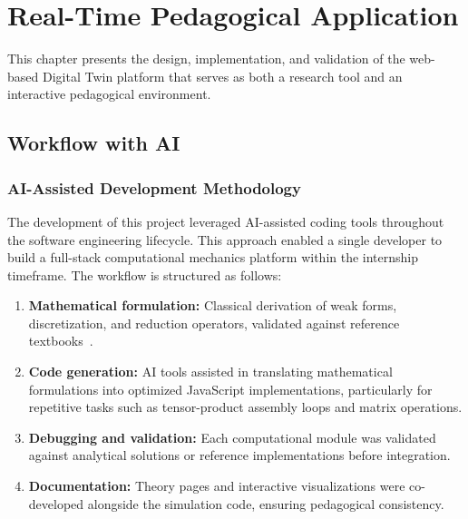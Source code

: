 \chapter{Real-Time Pedagogical Application}
\label{ch:application}

This chapter presents the design, implementation, and validation of the web-based Digital Twin platform that serves as both a research tool and an interactive pedagogical environment.

\section{Workflow with AI}
\label{sec:ai-workflow}

\subsection{AI-Assisted Development Methodology}

The development of this project leveraged AI-assisted coding tools throughout the software engineering lifecycle. This approach enabled a single developer to build a full-stack computational mechanics platform within the internship timeframe. The workflow is structured as follows:

\begin{enumerate}
    \item \textbf{Mathematical formulation:} Classical derivation of weak forms, discretization, and reduction operators, validated against reference textbooks~\cite{cottrell2009,hughes2005}.
    
    \item \textbf{Code generation:} AI tools assisted in translating mathematical formulations into optimized JavaScript implementations, particularly for repetitive tasks such as tensor-product assembly loops and matrix operations.
    
    \item \textbf{Debugging and validation:} Each computational module was validated against analytical solutions or reference implementations before integration.
    
    \item \textbf{Documentation:} Theory pages and interactive visualizations were co-developed alongside the simulation code, ensuring pedagogical consistency.
\end{enumerate}

